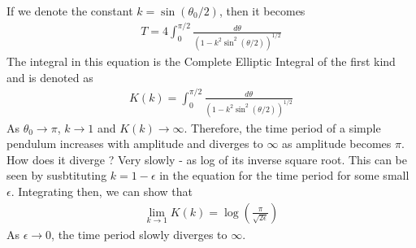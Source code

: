 \documentclass[11pt,a4paper]{article}
\newcommand{\1}{\vect{1}}
\begin{document}
If we denote the constant $k = \sin(\theta_0/2)$, then it becomes
\begin{align*}
T = 4\int_0^{\pi/2} \frac{d\theta}{(1-k^2\sin^2(\theta/2))^{1/2}}
\end{align*}
The integral in this equation is the Complete Elliptic Integral of the first kind and is denoted as
\begin{align*}
K(k) = \int_0^{\pi/2} \frac{d\theta}{(1-k^2\sin^2(\theta/2))^{1/2}}
\end{align*}
As $\theta_0 \to \pi$, $k\to 1$ and $K(k)\to \infty$. Therefore, the time period of a simple pendulum increases with amplitude and diverges to $\infty$ as amplitude becomes $\pi$. How does it diverge ? Very slowly - as log of its inverse square root. This can be seen by susbtituting $k = 1-\epsilon$ in the equation for the time period for some small $\epsilon$. Integrating then, we can show that
\begin{align*}
\lim_{k\to 1}K(k) = \log(\frac{\pi}{\sqrt{2\epsilon}})
\end{align*}
As $\epsilon \to 0$, the time period slowly diverges to $\infty$.
\end{document}
